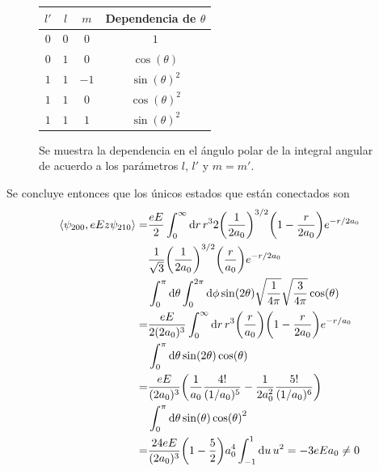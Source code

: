 \documentclass{article}
\begin{document}
\begin{enumerate}[1)]
\begin{enumerate}[a)]
\begin{figure}
\center
\begin{tabular}{|c|c|c|c|}
\hline
$l'$ & $l$ & $m$ & Dependencia de $\theta$ \\
\hline
$0$ & $0$ & $0$ & $1$ \\
$0$ & $1$ & $0$ & $\cos(\theta)$ \\
$1$ & $1$ & $-1$ & $\sin(\theta)^2$ \\
$1$ & $1$ & $0$ & $\cos(\theta)^2$ \\
$1$ & $1$ & $1$ & $\sin(\theta)^2$ \\ 
\hline
\end{tabular}
\caption{\label{tab:dependencia_polar}Se muestra la dependencia en el ángulo polar de la integral angular de acuerdo a los parámetros $l$, $l'$ y $m=m'$. }
\end{figure}
Se concluye entonces que los únicos estados que están conectados son
\begin{align}
\begin{split}
\langle\psi_{200},eEz\psi_{210}\rangle=&\frac{eE}{2}\int_0^\infty\dd{r}r^32\qty(\frac{1}{2a_0})^{3/2}\qty(1-\frac{r}{2a_0})e^{-r/2a_0}\\
&\frac{1}{\sqrt{3}}\qty(\frac{1}{2a_0})^{3/2}\qty(\frac{r}{a_0})e^{-r/2a_0}\\
&\int_0^\pi\dd{\theta}\int_0^{2\pi}\dd{\phi}\sin(2\theta)\sqrt{\frac{1}{4\pi}}\sqrt{\frac{3}{4\pi}}\cos(\theta)\\
=&\frac{eE}{2(2a_0)^3}\int_0^\infty\dd{r}r^3\qty(\frac{r}{a_0})\qty(1-\frac{r}{2a_0})e^{-r/a_0}\\
&\int_0^\pi\dd{\theta}\sin(2\theta)\cos(\theta)\\
=&\frac{eE}{(2a_0)^3}\qty(\frac{1}{a_0}\frac{4!}{(1/a_0)^5}-\frac{1}{2a_0^2}\frac{5!}{(1/a_0)^6})\\
&\int_0^\pi\dd{\theta}\sin(\theta)\cos(\theta)^2\\
=&\frac{24eE}{(2a_0)^3}\qty(1-\frac{5}{2})a_0^4\int_{-1}^1\dd{u}u^2=-3eEa_0\neq 0\\
\end{split}
\end{align}


\end{enumerate}
\end{enumerate}
\end{document}
